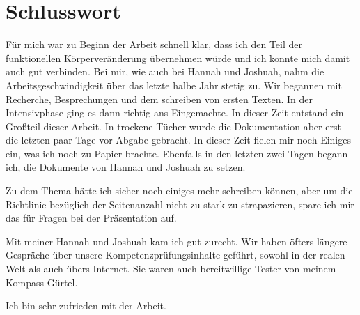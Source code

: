 \section{Schlusswort}
Für mich war zu Beginn der Arbeit schnell klar, dass ich den Teil der funktionellen Körperveränderung
übernehmen würde und ich konnte mich damit auch gut verbinden. Bei mir, wie auch bei Hannah und
Joshuah, nahm die Arbeitsgeschwindigkeit über das letzte halbe Jahr stetig zu. Wir begannen mit
Recherche, Besprechungen und dem schreiben von ersten Texten. In der Intensivphase ging es dann
richtig ans Eingemachte. In dieser Zeit entstand ein Großteil dieser Arbeit. In trockene Tücher wurde
die Dokumentation aber erst die letzten paar Tage vor Abgabe gebracht. In dieser Zeit fielen mir noch
Einiges ein, was ich noch zu Papier brachte. Ebenfalls in den letzten zwei Tagen begann ich,
die Dokumente von Hannah und Joshuah zu setzen.

Zu dem Thema hätte ich sicher noch einiges mehr schreiben können, aber um die Richtlinie bezüglich
der Seitenanzahl nicht zu stark zu strapazieren, spare ich mir das für Fragen bei der Präsentation
auf.

Mit meiner Hannah und Joshuah kam ich gut zurecht. Wir haben öfters längere Gespräche über unsere
Kompetenzprüfungsinhalte geführt, sowohl in der realen Welt als auch übers Internet. Sie waren auch
bereitwillige Tester von meinem Kompass-Gürtel.

Ich bin sehr zufrieden mit der Arbeit.
